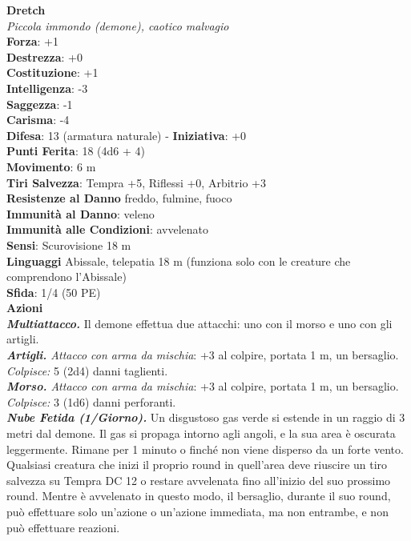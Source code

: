 \begin{multicols}{2}
\medskip\textbf{Dretch}\\
\emph{Piccola immondo (demone), caotico malvagio}\\
\textbf{Forza}: +1\\
\textbf{Destrezza}: +0\\
\textbf{Costituzione}: +1\\
\textbf{Intelligenza}: -3\\
\textbf{Saggezza}: -1\\
\textbf{Carisma}: -4\\
\textbf{Difesa}: 13 (armatura naturale) - \textbf{Iniziativa}: +0\\
\textbf{Punti Ferita}: 18 (4d6 + 4)\\
\textbf{Movimento}: 6 m\\
\textbf{Tiri Salvezza}: Tempra +5, Riflessi +0, Arbitrio +3\\
\textbf{Resistenze al Danno} freddo, fulmine, fuoco\\
\textbf{Immunità al Danno}: veleno\\
\textbf{Immunità alle Condizioni}: avvelenato\\
\textbf{Sensi}: Scurovisione 18 m\\
\textbf{Linguaggi} Abissale, telepatia 18 m (funziona solo con le creature che comprendono l'Abissale)\\
\textbf{Sfida}: 1/4 (50 PE)\smallskip\\
\smallskip\textbf{Azioni}\\
\emph{\textbf{Multiattacco.}} Il demone effettua due attacchi: uno con il morso e uno con gli artigli.\\
\emph{\textbf{Artigli.} Attacco con arma da mischia}: +3 al colpire, portata 1 m, un bersaglio.\\
\emph{Colpisce:} 5 (2d4) danni taglienti.\\
\emph{\textbf{Morso.} Attacco con arma da mischia}: +3 al colpire, portata 1 m, un bersaglio.\\
\emph{Colpisce:} 3 (1d6) danni perforanti.\\
\emph{\textbf{Nube Fetida (1/Giorno).}} Un disgustoso gas verde si estende in un raggio di 3 metri dal demone. Il gas si propaga intorno agli angoli, e la sua area è oscurata leggermente. Rimane per 1 minuto o finché non viene disperso da un forte vento. Qualsiasi creatura che inizi il proprio round in quell'area deve riuscire un tiro salvezza su Tempra DC  12 o restare avvelenata fino all'inizio del suo prossimo round. Mentre è avvelenato in questo modo, il bersaglio, durante il suo round, può effettuare solo un'azione o un'azione immediata, ma non entrambe, e non può effettuare reazioni.\\

\end{multicols}
